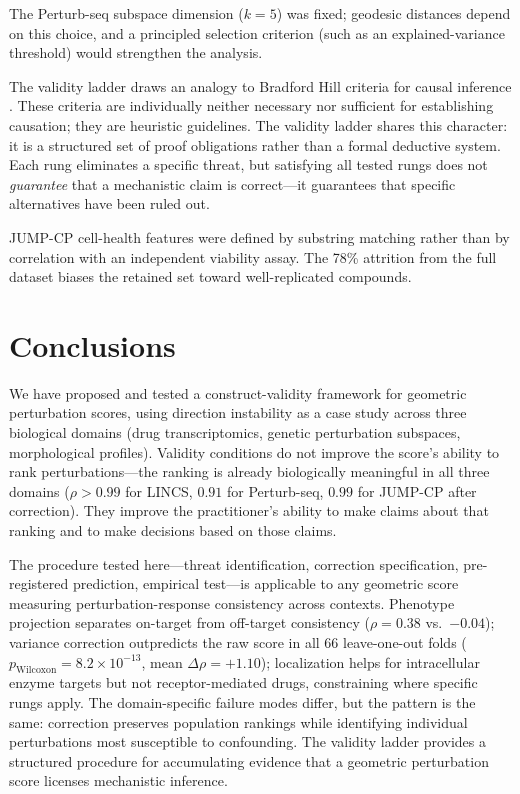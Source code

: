 \documentclass[11pt]{article}
\begin{document}
The Perturb-seq subspace dimension ($k = 5$) was fixed; geodesic
distances depend on this choice, and a principled selection criterion
(such as an explained-variance threshold) would strengthen the analysis.

The validity ladder draws an analogy to Bradford Hill criteria for causal
inference \citep{hill1965environment}. These criteria are individually
neither necessary nor
sufficient for establishing causation; they are heuristic guidelines. The
validity ladder shares this character: it is a structured set of proof
obligations rather than a formal deductive system. Each rung eliminates
a specific threat, but satisfying all tested rungs does not
\emph{guarantee} that a mechanistic claim is correct---it guarantees
that specific alternatives have been ruled out.

JUMP-CP cell-health features were defined by substring matching rather
than by correlation with an independent viability assay. The 78\% attrition
from the full dataset biases the retained set toward well-replicated
compounds.

\section{Conclusions}

We have proposed and tested a construct-validity framework for geometric
perturbation scores, using direction instability as a case study across
three biological domains (drug transcriptomics, genetic perturbation
subspaces, morphological profiles). Validity conditions do not improve the
score's ability to rank perturbations---the ranking is already biologically
meaningful in all three domains ($\rho > 0.99$ for LINCS, $0.91$ for
Perturb-seq, $0.99$ for JUMP-CP after correction). They improve the
practitioner's ability to make claims about that ranking and to make
decisions based on those claims.

The procedure tested here---threat identification, correction
specification, pre-registered prediction, empirical test---is applicable
to any geometric score measuring perturbation-response consistency across
contexts. Phenotype projection separates on-target from off-target
consistency ($\rho = 0.38$ vs.\ $-0.04$); variance correction
outpredicts the raw score in all 66 leave-one-out folds
($p_{\text{Wilcoxon}} = 8.2 \times 10^{-13}$, mean
$\Delta\rho = +1.10$); localization helps for intracellular enzyme
targets but not receptor-mediated drugs, constraining where specific
rungs apply. The domain-specific failure modes differ, but the pattern
is the same: correction preserves population rankings while identifying
individual perturbations most susceptible to confounding. The validity
ladder provides a structured procedure for accumulating evidence that
a geometric perturbation score licenses mechanistic inference.
\end{document}
